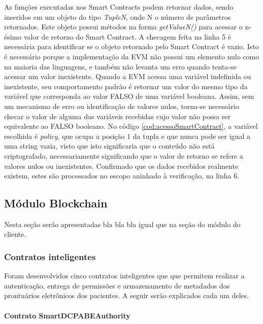 \documentclass[a4paper,11pt]{article}
\begin{document}
As funções executadas nos Smart Contracts podem retornar dados, sendo inseridos em um objeto do tipo \emph{TupleN}, onde N o número de parâmetros retornados. Este objeto possui métodos na forma \emph{getValueN()} para acessar o n-ésimo valor de retorno do Smart Contract.
A checagem feita na linha 5 é necessária para identificar se o objeto retornado pelo Smart Contract é vazio.
Isto é necessário porque a implementação da EVM não possui um elemento nulo como na maioria das linguagens, e também não levanta um erro quando tenta-se acessar um valor inexistente.
Quando a EVM acessa uma variável indefinida ou inexistente, seu comportamento padrão é retornar um valor do mesmo tipo da variável que corresponda ao valor FALSO de uma variável booleana.
Assim, sem um mecanismo de erro ou identificação de valores nulos, torna-se necessário checar o valor de alguma das variáveis recebidas cujo valor não possa ser equivalente ao FALSO booleano.
No código \ref{cod:acessoSmartContract}, a variável escolhida é \emph{policy}, que ocupa a posição 1 da tupla e que nunca pode ser igual a uma string vazia, visto que isto significaria que o conteúdo não está criptografado, necessariamente significando que o valor de retorno se refere a valores nulos ou inexistentes.
Confirmado que os dados recebidos realmente existem, estes são processados no escopo aninhado à verificação, na linha 6.

\subsection{Módulo Blockchain}

{\color{magenta}Nesta seção serão apresentadas bla bla bla igual que na seção do módulo do cliente.}

\subsubsection{Contratos inteligentes}
\label{sec:sub:ImplementacaoSmartContracts}

Foram desenvolvidos cinco contratos inteligentes que que permitem realizar a autenticação, entrega de permissões e armazenamento de metadados dos prontuários eletrônicos dos pacientes.
A seguir serão explicados cada um deles.

\paragraph{Contrato SmartDCPABEAuthority}

\end{document}
